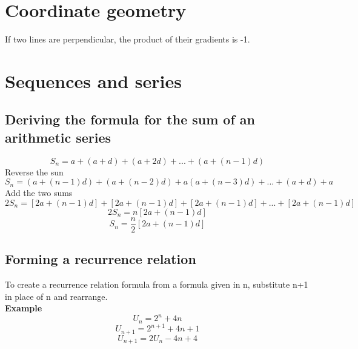 \documentclass{article}[18pt]
\begin{document}
\section{Coordinate geometry}
If two lines are perpendicular, the product of their gradients is -1.
\section{Sequences and series}
\subsection{Deriving the formula for the sum of an arithmetic series}
$$S_n=a+(a+d)+(a+2d)+...+(a+(n-1)d)$$
Reverse the sun
$$S_n=(a+(n-1)d)+(a+(n-2)d)+a(a+(n-3)d)+...+(a+d)+a$$
Add the two sums
$$2S_n=[2a+(n-1)d]+[2a+(n-1)d]+[2a+(n-1)d]+...+[2a+(n-1)d]$$
$$2S_n=n[2a+(n-1)d]$$
$$S_n=\frac{n}{2}[2a+(n-1)d]$$
\subsection{Forming a recurrence relation}
To create a recurrence relation formula from a formula given in n, substitute n+1 in place of n and rearrange.\\
\textbf{Example}
$$U_n=2^n+4n$$
$$U_{n+1}=2^{n+1}+4{n+1}$$
$$U_{n+1}=2U_n-4n+4$$
\end{document}

